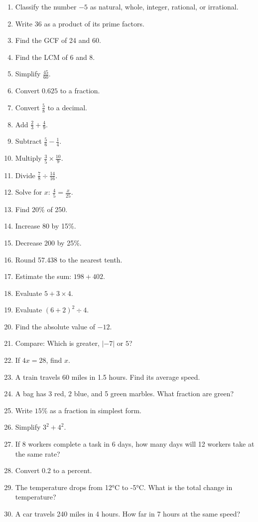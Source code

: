 \documentclass[12pt]{article}
\begin{document}
\begin{enumerate}
    \item Classify the number $-5$ as natural, whole, integer, rational, or irrational.
    \item Write $36$ as a product of its prime factors.
    \item Find the GCF of 24 and 60.
    \item Find the LCM of 6 and 8.
    \item Simplify $\frac{45}{60}$.
    \item Convert $0.625$ to a fraction.
    \item Convert $\frac{5}{8}$ to a decimal.
    \item Add $\frac{2}{3} + \frac{4}{9}$.
    \item Subtract $\frac{5}{6} - \frac{1}{4}$.
    \item Multiply $\frac{3}{5} \times \frac{10}{9}$.
    \item Divide $\frac{7}{8} \div \frac{14}{16}$.
    \item Solve for $x$: $\frac{4}{5} = \frac{x}{25}$.
    \item Find 20\% of 250.
    \item Increase 80 by 15\%.
    \item Decrease 200 by 25\%.
    \item Round 57.438 to the nearest tenth.
    \item Estimate the sum: $198 + 402$.
    \item Evaluate $5 + 3 \times 4$.
    \item Evaluate $(6 + 2)^2 \div 4$.
    \item Find the absolute value of $-12$.
    \item Compare: Which is greater, $|-7|$ or $5$?
    \item If $4x = 28$, find $x$.
    \item A train travels 60 miles in 1.5 hours. Find its average speed.
    \item A bag has 3 red, 2 blue, and 5 green marbles. What fraction are green?
    \item Write $15\%$ as a fraction in simplest form.
    \item Simplify $3^2 + 4^2$.
    \item If 8 workers complete a task in 6 days, how many days will 12 workers take at the same rate?
    \item Convert 0.2 to a percent.
    \item The temperature drops from 12°C to -5°C. What is the total change in temperature?
    \item A car travels 240 miles in 4 hours. How far in 7 hours at the same speed?
\end{enumerate}
\end{document}
